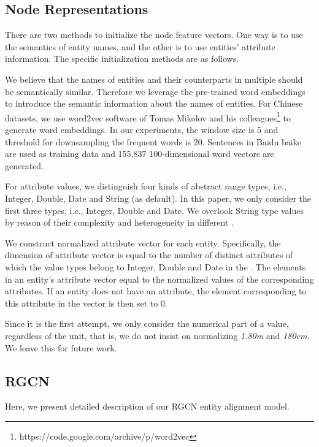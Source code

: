 	\subsection{Node Representations}
	\label{subsection:Node Representations}
	There are two methods to initialize the node feature vectors. 
	One way is to use the semantics of entity names, and the other is to use entities' attribute information. The specific initialization methods are as follows. 
	
	\label{wordvector}
	We believe that the names of entities and their counterparts in multiple \KGs should be semantically similar. Therefore we leverage the pre-trained word embeddings to introduce the semantic information about the names of entities.
	For Chinese datasets, we use word2vec software of Tomas Mikolov and his colleagues\footnote{https://code.google.com/archive/p/word2vec} to generate word embeddings. In our experiments, the window size is 5 and threshold for downsampling the frequent words is 20. Sentences in Baidu baike are used as training data and 155,837 100-dimensional word vectors are generated.
	
	For attribute values, we distinguish four kinds of abstract range types, i.e., Integer, Double, Date and String (as default). 
	In this paper, we only consider the first three types, i.e., Integer, Double and Date. 
	We overlook String type values by reason of their complexity and heterogeneity in different \KGs.
	
	We construct normalized attribute vector for each entity. 
	Specifically, the dimension of attribute vector is equal to the number of distinct attributes of which the value types belong to Integer, Double and Date in the \KG. 
	The elements in an entity’s attribute vector equal to the normalized values of the corresponding attributes. 
	If an entity does not have an attribute, the element corresponding to this attribute in the vector is then set to 0.
	
	Since it is the first attempt, we only consider the numerical part of a value, regardless of the unit, that is, we do not insist on normalizing \emph{1.80m} and \emph{180cm}. 
	We leave this for future work.
	
	\subsection{RGCN}
	\label{section:rgcn}
	Here, we present detailed description of our RGCN entity alignment model.
	

